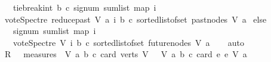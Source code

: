 \begin{isabellebody}
\ \ \ {\isacharparenleft}{\kern0pt}tie{\isacharunderscore}{\kern0pt}break{\isacharunderscore}{\kern0pt}int\ b\ c\ {\isacharparenleft}{\kern0pt}signum\ {\isacharparenleft}{\kern0pt}sum{\isacharunderscore}{\kern0pt}list\ {\isacharparenleft}{\kern0pt}map\ {\isacharparenleft}{\kern0pt}{\isasymlambda}i{\isachardot}{\kern0pt}\isanewline
\ {\isacharparenleft}{\kern0pt}vote{\isacharunderscore}{\kern0pt}Spectre\ {\isacharparenleft}{\kern0pt}reduce{\isacharunderscore}{\kern0pt}past\ V\ a{\isacharparenright}{\kern0pt}\ i\ b\ c{\isacharparenright}{\kern0pt}{\isacharparenright}{\kern0pt}\ {\isacharparenleft}{\kern0pt}sorted{\isacharunderscore}{\kern0pt}list{\isacharunderscore}{\kern0pt}of{\isacharunderscore}{\kern0pt}set\ {\isacharparenleft}{\kern0pt}past{\isacharunderscore}{\kern0pt}nodes\ V\ a{\isacharparenright}{\kern0pt}{\isacharparenright}{\kern0pt}{\isacharparenright}{\kern0pt}{\isacharparenright}{\kern0pt}{\isacharparenright}{\kern0pt}{\isacharparenright}{\kern0pt}\isanewline
\ else\ \isanewline
\ \ \ signum\ {\isacharparenleft}{\kern0pt}sum{\isacharunderscore}{\kern0pt}list\ {\isacharparenleft}{\kern0pt}map\ {\isacharparenleft}{\kern0pt}{\isasymlambda}i{\isachardot}{\kern0pt}\isanewline
\ \ \ {\isacharparenleft}{\kern0pt}vote{\isacharunderscore}{\kern0pt}Spectre\ V\ i\ b\ c{\isacharparenright}{\kern0pt}{\isacharparenright}{\kern0pt}\ {\isacharparenleft}{\kern0pt}sorted{\isacharunderscore}{\kern0pt}list{\isacharunderscore}{\kern0pt}of{\isacharunderscore}{\kern0pt}set\ {\isacharparenleft}{\kern0pt}future{\isacharunderscore}{\kern0pt}nodes\ V\ a{\isacharparenright}{\kern0pt}{\isacharparenright}{\kern0pt}{\isacharparenright}{\kern0pt}{\isacharparenright}{\kern0pt}{\isacharparenright}{\kern0pt}{\isachardoublequoteclose}\isanewline
%
\isadelimproof
\ \ %
\endisadelimproof
%
\isatagproof
{}\isamarkupfalse%
\ auto%
\endisatagproof
{\isafoldproof}%
%
\isadelimproof
\isanewline
%
\endisadelimproof
{}\isamarkupfalse%
\isanewline
%
\isadelimproof
%
\endisadelimproof
%
\isatagproof
{}\isamarkupfalse%
\isanewline
\ \ \isamarkupfalse%
\ {\isacharquery}{\kern0pt}R\ {\isacharequal}{\kern0pt}\ {\isachardoublequoteopen}\ measures\ {\isacharbrackleft}{\kern0pt}{\isacharparenleft}{\kern0pt}\ {\isasymlambda}{\isacharparenleft}{\kern0pt}V{\isacharcomma}{\kern0pt}\ a{\isacharcomma}{\kern0pt}\ b{\isacharcomma}{\kern0pt}\ c{\isacharparenright}{\kern0pt}{\isachardot}{\kern0pt}\ {\isacharparenleft}{\kern0pt}card\ {\isacharparenleft}{\kern0pt}verts\ V{\isacharparenright}{\kern0pt}{\isacharparenright}{\kern0pt}{\isacharparenright}{\kern0pt}{\isacharcomma}{\kern0pt}\ \ {\isacharparenleft}{\kern0pt}\ {\isasymlambda}{\isacharparenleft}{\kern0pt}V{\isacharcomma}{\kern0pt}\ a{\isacharcomma}{\kern0pt}\ b{\isacharcomma}{\kern0pt}\ c{\isacharparenright}{\kern0pt}{\isachardot}{\kern0pt}\ card\ {\isacharbraceleft}{\kern0pt}e{\isachardot}{\kern0pt}\ e\ {\isasymrightarrow}\isactrlsup {\isacharasterisk}{\kern0pt}\isactrlbsub V\isactrlesub \ a{\isacharbraceright}{\kern0pt}{\isacharparenright}{\kern0pt}{\isacharbrackright}{\kern0pt}{\isachardoublequoteclose}\ \ \isanewline

\end{isabellebody}
